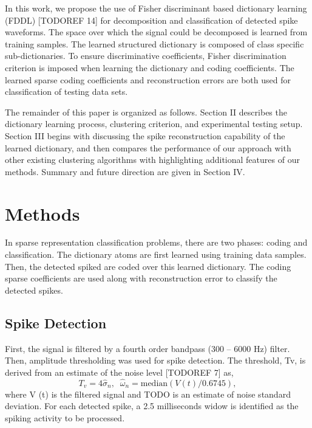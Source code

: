 \documentclass[conference]{IEEEtran}
\begin{document}
	In this work, we propose the use of Fisher discriminant based dictionary learning (FDDL) [TODOREF 14] for decomposition and classification of detected spike waveforms. The space over which the signal could be decomposed is learned from training samples. The learned structured dictionary is composed of class specific sub-dictionaries. To ensure discriminative coefficients, Fisher discrimination criterion is imposed when learning the dictionary and coding coefficients. The learned sparse coding coefficients and reconstruction errors are both used for classification of testing data sets.
	
	The remainder of this paper is organized as follows. Section II describes the dictionary learning process, clustering criterion, and experimental testing setup. Section III begins with discussing the spike reconstruction capability of the learned dictionary, and then compares the performance of our approach with other existing clustering algorithms with highlighting additional features of our methods. Summary and future direction are given in Section IV.
	
	\section{Methods}
	In sparse representation classification problems, there are two phases: coding and classification. The dictionary atoms are first learned using training data samples. Then, the detected spiked are coded over this learned dictionary. The coding sparse coefficients are used along with reconstruction error to classify the detected spikes.
	
	\subsection{Spike Detection}
	First, the signal is filtered by a fourth order bandpass (300 – 6000 Hz) filter. Then, amplitude thresholding was used for spike detection. The threshold, Tv, is derived from an estimate of the noise level [TODOREF 7] as,
	\begin{equation}
		T_v=4\hat{\sigma}_n,\;\;\hat{\omega}_n=\mathrm{median}(V(t)/0.6745),
	\end{equation}
	where V (t) is the filtered signal and TODO is an estimate of noise standard deviation. For each detected spike, a 2.5 milliseconds widow is identified as the spiking activity to be processed.
	
\end{document}
